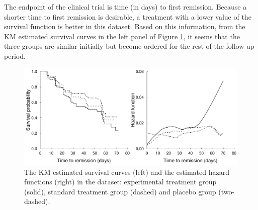 The endpoint of the clinical trial is time (in days) to first remission. Because a shorter time to first remission is desirable, a treatment with a lower value of the survival function is better in this dataset.
Based on this information, from the KM estimated survival curves in the left panel of Figure \ref{fig:threearm}, %
it seems that the three groups are similar initially but become ordered for the rest of the follow-up period.
\begin{figure}[H]
	\centerline{\includegraphics[width=0.99\columnwidth]{figures/paper_survELtest_3arm_surv_haz_20191220.pdf}} %
	\caption{The KM estimated survival curves (left) and the estimated hazard functions (right) 
		in the  dataset: experimental treatment group (solid), standard treatment group (dashed) and placebo group (two-dashed).
	}
	\label{fig:threearm}
\end{figure}

